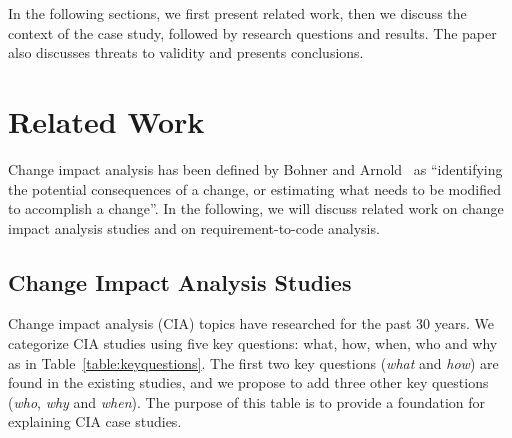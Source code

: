 \documentclass[conference]{IEEEtran}
\begin{document}
In the following sections, we first present related work, then we
discuss the context of the case study, followed by research questions
and results. The paper also discusses threats to validity and presents
conclusions.

\section{Related Work}

Change impact analysis has been defined by Bohner and
Arnold~\cite{arnold1993impact} as ``identifying the potential
consequences of a change, or estimating what needs to be modified to
accomplish a change''. In the following, we will discuss related work
on change impact analysis studies and on requirement-to-code analysis.

\subsection{Change Impact Analysis Studies}

Change impact analysis (CIA) topics have researched for the past 30
years. We categorize CIA studies using five key questions: what, how,
when, who and why as in Table~\ref{table:keyquestions}. The first two
key questions (\emph{what} and \emph{how}) are found in the existing
studies, and we propose to add three other key questions (\emph{who},
\emph{why} and \emph{when}). The purpose of this table is to provide a
foundation for explaining CIA case studies.
\end{document}
